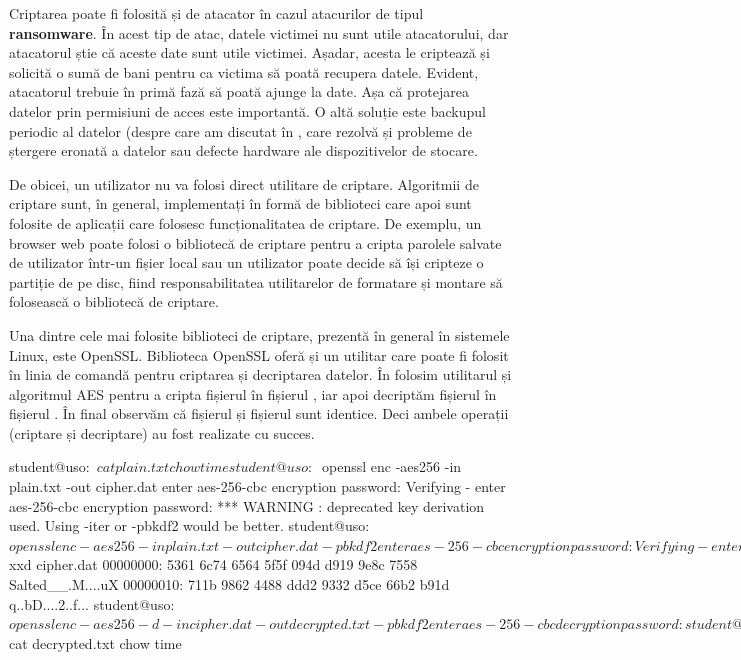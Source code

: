 Criptarea poate fi folosită și de atacator în cazul atacurilor de tipul \textbf{ransomware}.
În acest tip de atac, datele victimei nu sunt utile atacatorului, dar atacatorul știe că aceste date sunt utile victimei.
Așadar, acesta le criptează și solicită o sumă de bani pentru ca victima să poată recupera datele.
Evident, atacatorul trebuie în primă fază să poată ajunge la date.
Așa că protejarea datelor prin permisiuni de acces este importantă.
O altă soluție este backupul periodic al datelor (despre care am discutat în , care rezolvă și probleme de ștergere eronată a datelor sau defecte hardware ale dispozitivelor de stocare.

De obicei, un utilizator nu va folosi direct utilitare de criptare.
Algoritmii de criptare sunt, în general, implementați în formă de biblioteci care apoi sunt folosite de aplicații care folosesc funcționalitatea de criptare.
De exemplu, un browser web poate folosi o bibliotecă de criptare pentru a cripta parolele salvate de utilizator într-un fișier local sau un utilizator poate decide să își cripteze o partiție de pe disc, fiind responsabilitatea utilitarelor de formatare și montare să folosească o bibliotecă de criptare.

Una dintre cele mai folosite biblioteci de criptare, prezentă în general în sistemele Linux, este OpenSSL.
Biblioteca OpenSSL oferă și un utilitar care poate fi folosit în linia de comandă pentru criptarea și decriptarea datelor.
În  folosim utilitarul  și algoritmul AES pentru a cripta fișierul  în fișierul , iar apoi decriptăm fișierul  în fișierul .
În final observăm că fișierul  și fișierul  sunt identice.
Deci ambele operații (criptare și decriptare) au fost realizate cu succes.

\begin{screen}[caption={Criptare și decriptare folosind openssl},label={lst:sec:openssl}]
student@uso:~$ cat plain.txt
chow time
student@uso:~$ openssl enc -aes256 -in plain.txt -out cipher.dat
enter aes-256-cbc encryption password:
Verifying - enter aes-256-cbc encryption password:
*** WARNING : deprecated key derivation used.
Using -iter or -pbkdf2 would be better.
student@uso:~$ openssl enc -aes256 -in plain.txt -out cipher.dat -pbkdf2
enter aes-256-cbc encryption password:
Verifying - enter aes-256-cbc encryption password:
student@uso:~$ xxd cipher.dat
00000000: 5361 6c74 6564 5f5f 094d d919 9e8c 7558  Salted__.M....uX
00000010: 711b 9862 4488 ddd2 9332 d5ce 66b2 b91d  q..bD....2..f...
student@uso:~$ openssl enc -aes256 -d -in cipher.dat -out decrypted.txt -pbkdf2
enter aes-256-cbc decryption password:
student@uso:~$ cat decrypted.txt
chow time
\end{screen}

